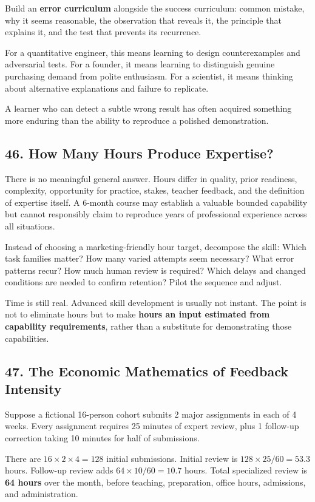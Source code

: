 Build an \textbf{error curriculum} alongside the success curriculum: common mistake, why it seems reasonable, the observation that reveals it, the principle that explains it, and the test that prevents its recurrence.

For a quantitative engineer, this means learning to design counterexamples and adversarial tests. For a founder, it means learning to distinguish genuine purchasing demand from polite enthusiasm. For a scientist, it means thinking about alternative explanations and failure to replicate.

A learner who can detect a subtle wrong result has often acquired something more enduring than the ability to reproduce a polished demonstration.

\subsection*{46. How Many Hours Produce Expertise?}

There is no meaningful general answer. Hours differ in quality, prior readiness, complexity, opportunity for practice, stakes, teacher feedback, and the definition of expertise itself. A 6-month course may establish a valuable bounded capability but cannot responsibly claim to reproduce years of professional experience across all situations.

Instead of choosing a marketing-friendly hour target, decompose the skill: Which task families matter? How many varied attempts seem necessary? What error patterns recur? How much human review is required? Which delays and changed conditions are needed to confirm retention? Pilot the sequence and adjust.

Time is still real. Advanced skill development is usually not instant. The point is not to eliminate hours but to make \textbf{hours an input estimated from capability requirements}, rather than a substitute for demonstrating those capabilities.

\subsection*{47. The Economic Mathematics of Feedback Intensity}

Suppose a fictional 16-person cohort submits 2 major assignments in each of 4 weeks. Every assignment requires 25 minutes of expert review, plus 1 follow-up correction taking 10 minutes for half of submissions.

There are $16 \times 2 \times 4 = 128$ initial submissions. Initial review is $128 \times 25 / 60 = 53.3$ hours. Follow-up review adds $64 \times 10 / 60 = 10.7$ hours. Total specialized review is \textbf{64 hours} over the month, before teaching, preparation, office hours, admissions, and administration.

